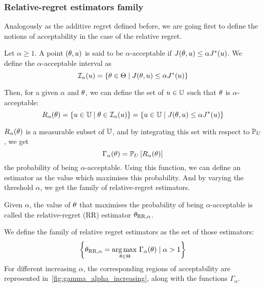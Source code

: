 \documentclass[../../Main_ManuscritThese.tex]{subfiles}
\begin{document}
\subsubsection{Relative-regret estimators family}
Analogously as the additive regret defined before, we are going first
to define the notions of acceptability in the case of the relative
regret.
\begin{definition}
  Let $\alpha\geq 1$.  A point $(\theta, u)$ is said to be
  $\alpha$-acceptable if $J(\theta, u) \leq \alpha J^*(u)$.  We
  define the $\alpha$-acceptable interval as
  \begin{equation}
    \mathcal{I}_{\alpha}(u) = \left\{\theta \in \Theta \mid J(\theta,u) \leq \alpha J^*(u) \right\}
  \end{equation}

  Then, for a given $\alpha$ and $\theta$, we can define the set of
  $u\in \mathbb{U}$ such that $\theta$ is $\alpha$-acceptable:
\begin{equation}
  R_{\alpha}(\theta) = \left\{u \in \mathbb{U} \mid \theta \in \mathcal{I}_{\alpha}(u) \right\} = \left\{u \in \mathbb{U} \mid  J(\theta, u) \leq \alpha J^*(u) \right\}
\end{equation}
\end{definition}
$R_{\alpha}(\theta)$ is a measurable subset of $\mathbb{U}$, and by integrating this set with respect to $\mathbb{P}_U$, we get
\begin{equation}
\Gamma_{\alpha}(\theta) = \mathbb{P}_{U}\left[R_\alpha(\theta)\right]
\end{equation}
the probability of being $\alpha$-acceptable. Using this function, we
can define an estimator as the value which maximises this
probability. And by varying the threshold $\alpha$, we get the family
of relative-regret estimators.


\begin{definition}
  \label{def:RR_family}
  Given $\alpha$, the value of $\theta$ that maximises the probability of
  being $\alpha$-acceptable is called the relative-regret (RR)
  estimator ${\theta}_{\mathrm{RR},\alpha}$.
  
  We define the family of relative regret estimators as the set of
  those estimators:
\begin{equation}
  \label{eq:def_RR_family}
    \left\{{\theta}_{\mathrm{RR,\alpha}} = \operatorname*{arg\,max \,}_{\theta\in\Theta} \Gamma_{\alpha}(\theta)\mid \alpha > 1\right\}
    \end{equation}
    For different increasing $\alpha$, the corresponding regions of
    acceptability are represented in~\cref{fig:gamma_alpha_increasing},
    along with the functions $\Gamma_{\alpha}$.
  \end{definition}
\end{document}
